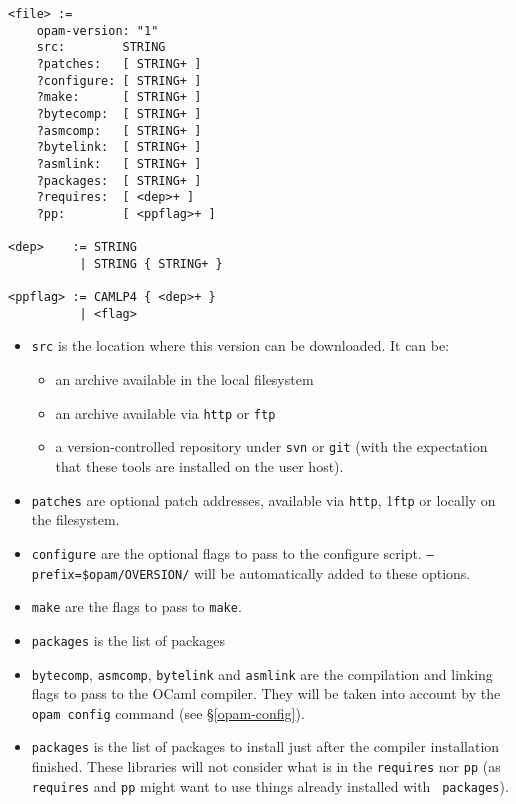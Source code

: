 \documentclass[a4paper,11pt]{article}
\begin{document}
{
\begin{Verbatim}[frame=single]
<file> :=
    opam-version: "1"
    src:        STRING
    ?patches:   [ STRING+ ]
    ?configure: [ STRING+ ]
    ?make:      [ STRING+ ]
    ?bytecomp:  [ STRING+ ]
    ?asmcomp:   [ STRING+ ]
    ?bytelink:  [ STRING+ ]
    ?asmlink:   [ STRING+ ]
    ?packages:  [ STRING+ ]
    ?requires:  [ <dep>+ ]
    ?pp:        [ <ppflag>+ ]

<dep>    := STRING
          | STRING { STRING+ }

<ppflag> := CAMLP4 { <dep>+ }
          | <flag>
\end{Verbatim}
}
\begin{itemize}

\item {\tt src} is the location where this version can be downloaded. It can be:
\begin{itemize}
\item an archive available in the local filesystem
\item an archive available via {\tt http} or {\tt ftp}
\item a version-controlled repository under {\tt svn} or {\tt git}
  (with the expectation that these tools are installed on the user host).
\end{itemize}

\item {\tt patches} are optional patch addresses, available via {\tt http}, 1{\tt ftp}
  or locally on the filesystem.

\item {\tt configure} are the optional flags to pass to the configure
  script. {\tt --prefix=\$opam/OVERSION/} will be automatically added
  to these options.

\item {\tt make} are the flags to pass to {\tt make}.

\item {\tt packages} is the list of packages

\item {\tt bytecomp}, {\tt asmcomp}, {\tt bytelink} and {\tt asmlink}
  are the compilation and linking flags to pass to the OCaml
  compiler. They will be taken into account by the \verb+opam config+
  command (see \S\ref{opam-config}).

\item {\tt packages} is the list of packages to install just after the
  compiler installation finished. These libraries will not consider
  what is in the {\tt requires} nor {\tt pp} (as {\tt requires} and
  {\tt pp} might want to use things already installed with {\tt
    packages}).


\end{itemize}
\end{document}
